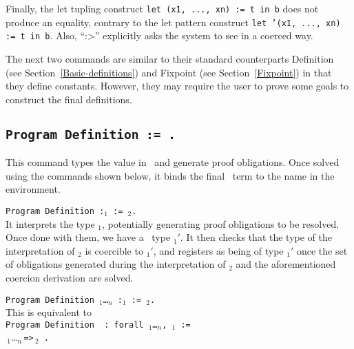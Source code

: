 Finally, the let tupling construct {\tt let (x1, ..., xn) := t in b}
does not produce an equality, contrary to the let pattern construct 
{\tt let '(x1, ..., xn) := t in b}.
Also, ``{\term}:>'' explicitly asks the system to see {\term} in a coerced
way.

The next two commands are similar to their standard counterparts
Definition (see Section~\ref{Basic-definitions}) and Fixpoint (see Section~\ref{Fixpoint}) in that
they define constants. However, they may require the user to prove some
goals to construct the final definitions.

\subsection{\tt Program Definition {\ident} := {\term}.
  \label{ProgramDefinition}}

This command types the value {\term} in \Russell\ and generate proof
obligations. Once solved using the commands shown below, it binds the final
\Coq\ term to the name {\ident} in the environment.

\begin{ErrMsgs}
\item {}
\end{ErrMsgs}

\begin{Variants}
\item {\tt Program Definition {\ident} {\tt :}{\term$_1$} :=
    {\term$_2$}.}\\
  It interprets the type {\term$_1$}, potentially generating proof
  obligations to be resolved. Once done with them, we have a \Coq\ type
  {\term$_1'$}. It then checks that the type of the interpretation of
  {\term$_2$} is coercible to {\term$_1'$}, and registers {\ident} as
  being of type {\term$_1'$} once the set of obligations generated
  during the interpretation of {\term$_2$} and the aforementioned
  coercion derivation are solved.
\item {\tt Program Definition {\ident} {\binder$_1$}\ldots{\binder$_n$}
       {\tt :}\term$_1$ {\tt :=} {\term$_2$}.}\\
  This is equivalent to \\
   {\tt Program Definition\,{\ident}\,{\tt :\,forall} %
       {\binder$_1$}\ldots{\binder$_n$}{\tt ,}\,\term$_1$\,{\tt :=}} \\
       \,{\binder$_1$}\ldots{\binder$_n$}\,{\tt =>}\,{\term$_2$}\,%
       {\tt .}
\end{Variants}

